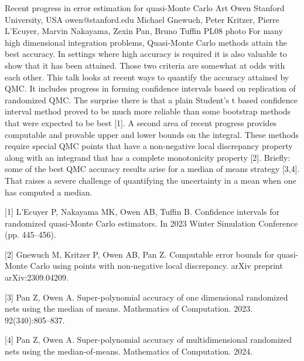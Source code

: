 \documentclass[12pt,a4paper,figuresright]{book}
\begin{document}
\begin{talk}
	{Recent progress in error estimation for quasi-Monte Carlo}%
	{Art Owen}%
	{Stanford University, USA}%
	{owen@stanford.edu}%
	{Michael Gnewuch, Peter Kritzer, Pierre L'Ecuyer, Marvin Nakayama,  Zexin Pan, Bruno Tuffin}%
	{}%
	{}%
	{PL08}%
	{photo}%
	For many high dimensional integration problems, Quasi-Monte Carlo methods
attain the best accuracy.  In settings where high accuracy is required it is
also valuable to show that it has been attained. Those two criteria are somewhat
at odds with each other.  This talk looks at recent ways to quantify the
accuracy attained by QMC.  It includes progress in forming confidence
intervals based on replication of randomized QMC.  The surprise there is that
a plain Student's t based confidence interval method proved to be much more
reliable than some bootstrap methods that were expected to be best [1].  A second
area of recent progress provides computable and provable upper and lower
bounds on the integral.  These methods require special QMC points that
have a non-negative local discrepancy property along with an integrand
that has a complete monotonicity property [2]. Briefly: some of the best
QMC accuracy results arise for a median of means strategy [3,4].  That raises
a severe challenge of quantifying the uncertainty in a mean when one
has computed a median.				

\medskip

[1] L’Ecuyer P, Nakayama MK, Owen AB, Tuffin B. Confidence intervals for randomized quasi-Monte Carlo estimators. In 2023 Winter Simulation Conference (pp. 445--456).

[2] Gnewuch M, Kritzer P, Owen AB, Pan Z. Computable error bounds for quasi-Monte Carlo using points with non-negative local discrepancy. arXiv preprint arXiv:2309.04209. 

[3] Pan Z, Owen A. Super-polynomial accuracy of one dimensional randomized nets using the median of means. Mathematics of Computation. 2023. 92(340):805--837.

[4] Pan Z, Owen A. Super-polynomial accuracy of multidimensional randomized nets using the median-of-means. Mathematics of Computation. 2024.

\end{talk}
\end{document}
